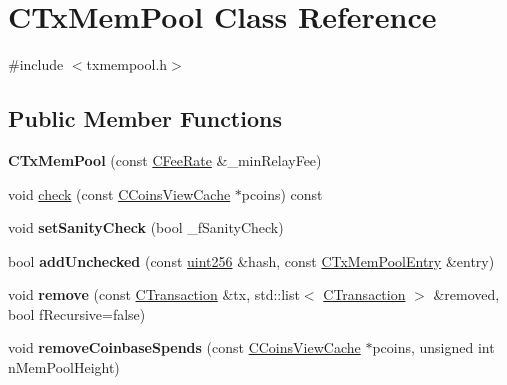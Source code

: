 \hypertarget{class_c_tx_mem_pool}{}\section{C\+Tx\+Mem\+Pool Class Reference}
\label{class_c_tx_mem_pool}


{\ttfamily \#include $<$txmempool.\+h$>$}

\subsection*{Public Member Functions}
\begin{DoxyCompactItemize}
\item 
\mbox{\label{class_c_tx_mem_pool_a82147548cfa962975690d1926b717c1c}} 
{\bfseries C\+Tx\+Mem\+Pool} (const \mbox{\hyperlink{class_c_fee_rate}{C\+Fee\+Rate}} \&\+\_\+min\+Relay\+Fee)
\item 
void \mbox{\hyperlink{class_c_tx_mem_pool_ab30fadfa811829e79accca41da6a8328}{check}} (const \mbox{\hyperlink{class_c_coins_view_cache}{C\+Coins\+View\+Cache}} $\ast$pcoins) const
\item 
\mbox{\label{class_c_tx_mem_pool_a1c0edb1fd5f0b02ddac46a6a97dcfd53}} 
void {\bfseries set\+Sanity\+Check} (bool \+\_\+f\+Sanity\+Check)
\item 
\mbox{\label{class_c_tx_mem_pool_a9e336997572ff8058d65afeb88ddde3b}} 
bool {\bfseries add\+Unchecked} (const \mbox{\hyperlink{classuint256}{uint256}} \&hash, const \mbox{\hyperlink{class_c_tx_mem_pool_entry}{C\+Tx\+Mem\+Pool\+Entry}} \&entry)
\item 
\mbox{\label{class_c_tx_mem_pool_a3a497097d9d5f325a2922a3970ac9da2}} 
void {\bfseries remove} (const \mbox{\hyperlink{class_c_transaction}{C\+Transaction}} \&tx, std\+::list$<$ \mbox{\hyperlink{class_c_transaction}{C\+Transaction}} $>$ \&removed, bool f\+Recursive=false)
\item 
\mbox{\label{class_c_tx_mem_pool_a6d1292640d0b6028bd5c602a6a50a983}} 
void {\bfseries remove\+Coinbase\+Spends} (const \mbox{\hyperlink{class_c_coins_view_cache}{C\+Coins\+View\+Cache}} $\ast$pcoins, unsigned int n\+Mem\+Pool\+Height)
\item 
\mbox{\label{class_c_tx_mem_pool_a11f1bddfbae7c03c6244db322876c0a7}} 

\end{DoxyCompactItemize}
